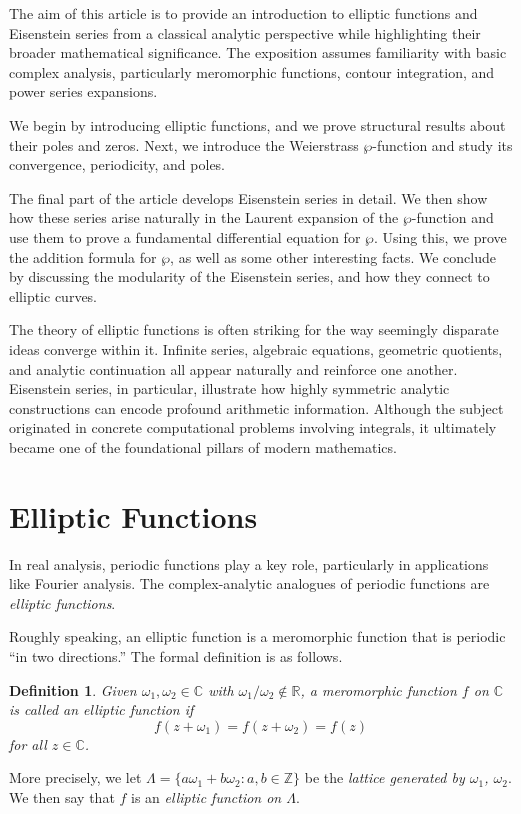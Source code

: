 \documentclass[12pt,reqno]{amsart}
\theoremstyle{plain}
\newtheorem{defn}[thm]{Definition}
\numberwithin{equation}{section}
\begin{document}
The aim of this article is to provide an introduction to elliptic functions and Eisenstein series from a classical analytic perspective while highlighting their broader mathematical significance. The exposition assumes familiarity with basic complex analysis, particularly meromorphic functions, contour integration, and power series expansions.

We begin by introducing elliptic functions, and we prove structural results about their poles and zeros. Next, we introduce the Weierstrass $\wp$-function and study its convergence, periodicity, and poles. 

The final part of the article develops Eisenstein series in detail. We then show how these series arise naturally in the Laurent expansion of the $\wp$-function and use them to prove a fundamental differential equation for $\wp$. Using this, we prove the addition formula for $\wp$, as well as some other interesting facts. We conclude by discussing the modularity of the Eisenstein series, and how they connect to elliptic curves. 


The theory of elliptic functions is often striking for the way seemingly disparate ideas converge within it. Infinite series, algebraic equations, geometric quotients, and analytic continuation all appear naturally and reinforce one another. Eisenstein series, in particular, illustrate how highly symmetric analytic constructions can encode profound arithmetic information. Although the subject originated in concrete computational problems involving integrals, it ultimately became one of the foundational pillars of modern mathematics.
\section{Elliptic Functions}
In real analysis, periodic functions play a key role, particularly in applications like Fourier analysis. The complex-analytic analogues of periodic functions are \textit{elliptic functions}. 

Roughly speaking, an elliptic function is a meromorphic function that is periodic ``in two directions.'' The formal definition is as follows.

\begin{defn}\label{defn: elliptic functions}
    Given $\omega_1,\omega_2\in \mathbb C$ with $\omega_1/\omega_2\not\in \mathbb R$, a meromorphic function $f$ on $\mathbb C$ is called an \textit{elliptic function} if
    \[f(z+\omega_1) = f(z+\omega_2) = f(z)\]
    for all $z\in \mathbb C$.
\end{defn}
More precisely, we let $\Lambda = \{a\omega_1 + b\omega_2: a,b\in \mathbb Z\}$ be the \textit{lattice generated by $\omega_1$, $\omega_2$}. We then say that $f$ is an \textit{elliptic function on $\Lambda$}. 
\end{document}
